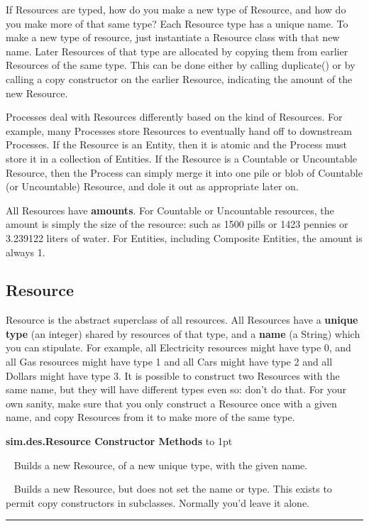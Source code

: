 \documentclass[twoside,10pt]{article}
\newcommand\class[1]{\index{Classes!{#1}}\textsf{#1}}
\newcommand\method[1]{\hbox{\textsf{#1}}}
\newcommand*{\xfill}[1][0pt]{%
	\cleaders
		\hbox to 1pt{\hss
			\raisebox{#1}{\rule{1.2pt}{0.4pt}}%
			\hss}\hfill}
\newenvironment{methods}[1]{
\vspace{1.0em}\noindent\textsf{\textbf{#1 Methods}}\quad \xfill[0.5ex]
\vspace{-0.25em}
\begin{description}
\small}
{\end{description}\hrule\vspace{1.5em}}
\newcommand{\mthd}[1]{\item[{\sf #1}]~\newline}
\begin{document}
If Resources are typed, how do you make a new type of Resource, and how do you make more of that same type?  Each Resource type has a unique name.  To make a new type of resource, just instantiate a Resource class with that new name.  Later Resources of that type are allocated by copying them from earlier Resources of the same type. This can be done either by calling \method{duplicate()} or by calling a copy constructor on the earlier Resource, indicating the amount of the new Resource.

Processes deal with Resources differently based on the kind of Resources.  For example, many Processes store Resources to eventually hand off to downstream Processes.  If the Resource is an Entity, then it is atomic and the Process must store it in a collection of Entities.  If the Resource is a Countable or Uncountable Resource, then the Process can simply merge it into one pile or blob of Countable (or Uncountable) Resource, and dole it out as appropriate later on.

All Resources have {\bf amounts}.  For Countable or Uncountable resources, the amount is simply the size of the resource: such as 1500 pills or 1423 pennies or 3.239122 liters of water.  For Entities, including Composite Entities, the amount is always 1.

\subsection{Resource}

Resource is the abstract superclass of all resources.  All Resources have a {\bf unique type} (an integer) shared by resources of that type, and a {\bf name} (a String) which you can stipulate.  For example, all Electricity resources might have type 0, and all Gas resources might have type 1 and all Cars might have type 2 and all Dollars might have type 3.  It is possible to construct two Resources with the same name, but they will have different types even so: don't do that.  For your own sanity, make sure that you only construct a Resource once with a given name, and copy Resources from it to make more of the same type.

\begin{methods}{\class{sim.des.Resource} Constructor}
\mthd{public Resource(String name)}
Builds a new Resource, of a new unique type, with the given name.
\mthd{protected Resource()}
Builds a new Resource, but does not set the name or type.  This exists to permit copy constructors in subclasses.  Normally you'd leave it alone.
\end{methods}
\end{document}
